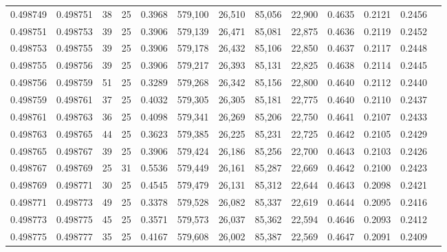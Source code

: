 \begin{tabular}{rrrrrrrrrrrrr}
0.498749 & 0.498751 &    38 &  25 &                                     0.3968 & 579,100 &  26,510 &  85,056 &  22,900 & 0.4635 & 0.2121 & 0.2456 \\
0.498751 & 0.498753 &    39 &  25 &                                     0.3906 & 579,139 &  26,471 &  85,081 &  22,875 & 0.4636 & 0.2119 & 0.2452 \\
0.498753 & 0.498755 &    39 &  25 &                                     0.3906 & 579,178 &  26,432 &  85,106 &  22,850 & 0.4637 & 0.2117 & 0.2448 \\
0.498755 & 0.498756 &    39 &  25 &                                     0.3906 & 579,217 &  26,393 &  85,131 &  22,825 & 0.4638 & 0.2114 & 0.2445 \\
0.498756 & 0.498759 &    51 &  25 &                                     0.3289 & 579,268 &  26,342 &  85,156 &  22,800 & 0.4640 & 0.2112 & 0.2440 \\
0.498759 & 0.498761 &    37 &  25 &                                     0.4032 & 579,305 &  26,305 &  85,181 &  22,775 & 0.4640 & 0.2110 & 0.2437 \\
0.498761 & 0.498763 &    36 &  25 &                                     0.4098 & 579,341 &  26,269 &  85,206 &  22,750 & 0.4641 & 0.2107 & 0.2433 \\
0.498763 & 0.498765 &    44 &  25 &                                     0.3623 & 579,385 &  26,225 &  85,231 &  22,725 & 0.4642 & 0.2105 & 0.2429 \\
0.498765 & 0.498767 &    39 &  25 &                                     0.3906 & 579,424 &  26,186 &  85,256 &  22,700 & 0.4643 & 0.2103 & 0.2426 \\
0.498767 & 0.498769 &    25 &  31 &                                     0.5536 & 579,449 &  26,161 &  85,287 &  22,669 & 0.4642 & 0.2100 & 0.2423 \\
0.498769 & 0.498771 &    30 &  25 &                                     0.4545 & 579,479 &  26,131 &  85,312 &  22,644 & 0.4643 & 0.2098 & 0.2421 \\
0.498771 & 0.498773 &    49 &  25 &                                     0.3378 & 579,528 &  26,082 &  85,337 &  22,619 & 0.4644 & 0.2095 & 0.2416 \\
0.498773 & 0.498775 &    45 &  25 &                                     0.3571 & 579,573 &  26,037 &  85,362 &  22,594 & 0.4646 & 0.2093 & 0.2412 \\
0.498775 & 0.498777 &    35 &  25 &                                     0.4167 & 579,608 &  26,002 &  85,387 &  22,569 & 0.4647 & 0.2091 & 0.2409 \\

\end{tabular}
